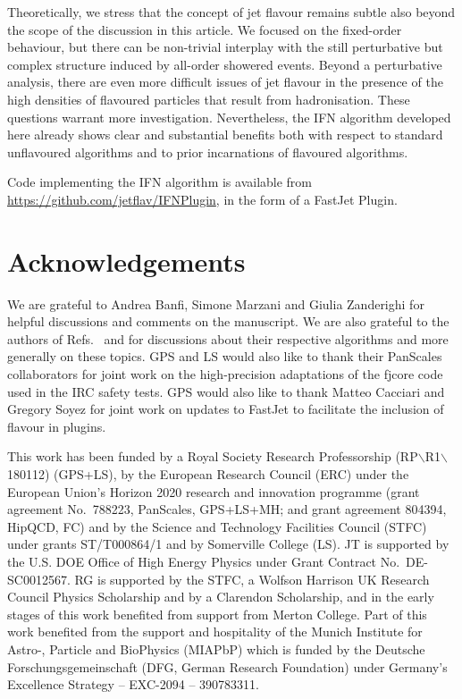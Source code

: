 \documentclass[nofootinbib,twocolumn,preprintnumbers,superscriptaddress,aps]{revtex4-2}
\begin{document}
Theoretically, we stress that the concept of jet flavour remains
subtle also beyond the scope of the discussion in this article.
%
We focused on the fixed-order behaviour, but there can be non-trivial interplay with the still perturbative but
complex structure induced by all-order showered events.
%
Beyond a perturbative analysis, there are even more difficult issues of jet flavour in the presence of the high
densities of flavoured particles that result from hadronisation. 
%
These questions warrant more investigation.
%
Nevertheless, the IFN algorithm developed here already shows clear and
substantial benefits both with respect to standard unflavoured
algorithms and to prior incarnations of flavoured algorithms.

Code implementing the IFN algorithm is available from
\url{https://github.com/jetflav/IFNPlugin}, in the form of a FastJet
Plugin.

\section*{Acknowledgements}



We are grateful to Andrea Banfi, Simone Marzani and Giulia Zanderighi
for helpful discussions and comments on the manuscript.
%
We are also grateful to the authors of Refs.~\cite{Czakon:2022wam} and
\cite{Gauld:2022lem} for discussions about their respective
algorithms and more generally on these topics.
%
GPS and LS would also like to thank their PanScales collaborators for
joint work
% 
on the high-precision adaptations of the fjcore code used in the IRC
safety tests.
%
GPS would also like to thank Matteo Cacciari and Gregory Soyez for
joint work on updates to FastJet to facilitate the inclusion of
flavour in plugins.

This work has been funded 
%
by a Royal Society Research Professorship
(RP$\backslash$R1$\backslash$180112) (GPS+LS),
%
by the European Research Council (ERC) under the European Union’s
Horizon 2020 research and innovation programme (grant agreement No.\
788223, PanScales, GPS+LS+MH; and grant agreement 804394, HipQCD,
FC) and
%
by the Science and Technology Facilities Council (STFC) under grants
ST/T000864/1 and by Somerville College (LS).
%
JT is supported by the U.S. DOE Office of High Energy Physics under
Grant Contract No.~DE-SC0012567.
%
RG is supported by the STFC, a Wolfson Harrison UK Research Council
Physics Scholarship and by a Clarendon Scholarship, and in the early
stages of this work benefited from support from Merton College.
%
Part of this work benefited from the support and hospitality of the
Munich Institute for Astro-, Particle and BioPhysics (MIAPbP) which is
funded by the Deutsche Forschungsgemeinschaft (DFG, German Research
Foundation) under Germany's Excellence Strategy -- EXC-2094 --
390783311.
\end{document}
